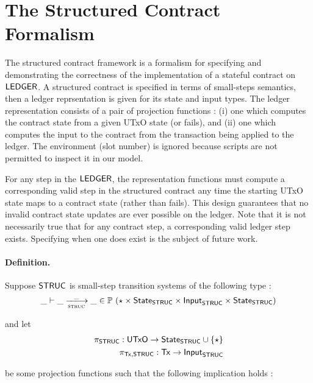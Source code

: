 \section{The Structured Contract Formalism}
\label{sec:struc}

The structured contract framework is a formalism for specifying and demonstrating
the correctness of the implementation of a stateful contract on $\mathsf{LEDGER}$.
A structured contract is specified in terms of small-steps semantics, then
a ledger reprsentation is given for its state and input types. The ledger representation
consists of
a pair of projection functions : (i) one which computes the contract state from
a given UTxO state (or fails), and (ii) one which computes the input to the contract
from the transaction being applied to the ledger. The environment (slot number)
is ignored because scripts are not permitted to inspect it in our model.

For any step in the $\mathsf{LEDGER}$, the representation functions must compute a
corresponding valid step in the structured contract any time the starting
UTxO state maps to a contract state (rather than fails).
This design guarantees that no invalid contract state updates are ever possible
on the ledger. Note that it is not necessarily true that for any contract
step, a corresponding valid ledger step exists. Specifying when one does exist
is the subject of future work.

\paragraph{Definition. }
\label{def:structured}

Suppose $\mathsf{STRUC}$ is small-step transition systems of the following type :
\begin{equation*}
  \_ \vdash
  \var{\_} \trans{struc}{\_} \var{\_}
  \in \powerset (\emptytype \times \State_{\STRUC} \times \Input_{\STRUC} \times \State_{\STRUC})
\end{equation*}

and let
\begin{align*}
  \pi_{\mathsf{STRUC}} : \mathsf{UTxO} \to \mathsf{State}_{\mathsf{STRUC}} \cup \{\star\} \\
  \pi_{\mathsf{Tx},\mathsf{STRUC}} : \mathsf{Tx} \to \textsf{Input}_{\mathsf{STRUC}}
\end{align*}

be some projection functions such that the following implication holds :

